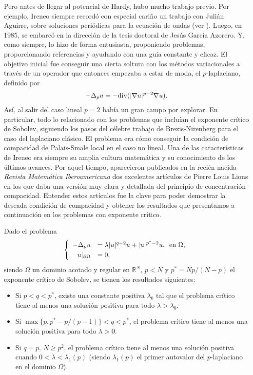 Pero antes de llegar al potencial de Hardy, hubo mucho trabajo previo. Por ejemplo, Ireneo siempre record\'o con especial cari\~no un trabajo con Juli\'an Aguirre, sobre soluciones peri\'odicas para la ecuaci\'on de ondas {(ver \cite{Aguirre-Peral})}. Luego, en 1985, se embarc\'o en la direcci\'on de la tesis doctoral de Jes\'us Garc\'ia Azorero. Y, como siempre, lo hizo de forma entusiasta, proponiendo problemas, proporcionando referencias y ayudando con una gu\'ia constante y eficaz. El objetivo inicial fue conseguir una cierta soltura con los m\'etodos variacionales a trav\'es de un operador que entonces empezaba a estar de moda, el $p$-laplaciano, definido por 
$$ -\Delta_p u= -\hbox{div}(|\nabla u|^{p-2} \nabla u).$$ 
As\'i, al salir del caso lineal $p=2$ hab\'ia un gran campo por explorar. En particular, todo lo relacionado con los problemas que inclu\'ian el exponente cr\'itico de Sobolev, siguiendo los pasos del c\'elebre trabajo de {Brezis-Nirenberg} para el caso del laplaciano cl\'asico. El problema era c\'omo conseguir la condici\'on de compacidad de Palais-Smale local en el caso no lineal.  Una de las caracter\'isticas de Ireneo era siempre su amplia cultura matem\'atica y su conocimiento de los \'ultimos avances. Por aquel tiempo, aparecieron publicados en la reci\'en nacida \textit{Revista Matem\'atica Iberoamericana}
 dos excelentes art\'iculos de {Pierre Louis Lions} en los que daba una versi\'on muy clara y detallada del principio de concentraci\'on-compacidad. Entender estos art\'iculos fue la clave para poder demostrar la deseada condici\'on de compacidad y obtener los  resultados que presentamos a continuaci\'on en los problemas con exponente cr\'itico.

Dado el problema
$$\left\{
\begin{array}{rl}
-\Delta_p u & = \lambda |u|^{q-2} u + |u|^{p^*-2} u, \, \hbox{ en }  \Omega, \\[1mm]
u|_{\partial \Omega} &= 0, 
\end{array}\right.
$$
siendo $\Omega $ un dominio acotado y regular en $ \mathbb{R}^N $, $ p <N $  y $ p^* = {Np}/{(N-p)} $ el exponente cr\'itico de Sobolev, se tienen los resultados siguientes: 
\begin{itemize}
\item Si $ p < q < p^*$, existe una constante positiva $ \lambda_0$ tal que el problema cr\'itico tiene al menos una soluci\'on positiva para todo $ \lambda > \lambda_0$.
\item  Si $\max \{ p, p^*-  p/(p-1)\} <q<p^*$, el problema cr\'itico tiene al menos una soluci\'on positiva para todo $\lambda >0 $.
\item Si $ q=p, \, N\ge p^2 $, el problema cr\'itico tiene al menos una soluci\'on positiva cuando $ 0<\lambda< \lambda_1(p)$ (siendo $\lambda_1(p)$ el primer autovalor del $p$-laplaciano en el dominio $ \Omega$). 
\end{itemize}

